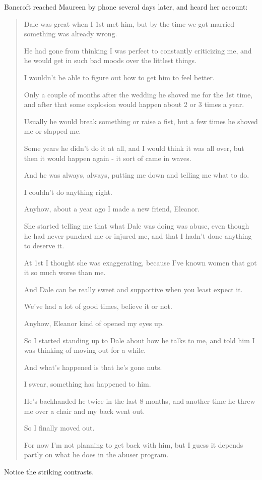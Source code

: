\documentclass[oneside]{article}
\numberwithin{equation}{section}
\begin{document}
Bancroft reached Maureen by phone several days later, and heard her account:
\begin{quotation}
    Dale was great when I 1st met him, but by the time we got married something was already wrong.
    
    He had gone from thinking I was perfect to constantly criticizing me, and he would get in such bad moods over the littlest things.
    
    I wouldn't be able to figure out how to get him to feel better.
    
    Only a couple of months after the wedding he shoved me for the 1st time, and after that some explosion would happen about 2 or 3 times a year.
    
    Usually he would break something or raise a fist, but a few times he shoved me or slapped me.
    
    Some years he didn't do it at all, and I would think it was all over, but then it would happen again - it sort of came in waves.
    
    And he was always, always, putting me down and telling me what to do.
    
    I couldn't do anything right.
    
    Anyhow, about a year ago I made a new friend, Eleanor.
    
    She started telling me that what Dale was doing was abuse, even though he had never punched me or injured me, and that I hadn't done anything to deserve it.
    
    At 1st I thought she was exaggerating, because I've known women that got it so much worse than me.
    
    And Dale can be really sweet and supportive when you least expect it.
    
    We've had a lot of good times, believe it or not.
    
    Anyhow, Eleanor kind of opened my eyes up.
    
    So I started standing up to Dale about how he talks to me, and told him I was thinking of moving out for a while.
    
    And what's happened is that he's gone nuts.
    
    I swear, something has happened to him.
    
    He's backhanded he twice in the last 8 months, and another time he threw me over a chair and my back went out.
    
    So I finally moved out.
    
    For now I'm not planning to get back with him, but I guess it depends partly on what he does in the abuser program.
\end{quotation}
Notice the striking contrasts.
\end{document}
